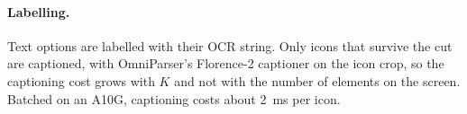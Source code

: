 \paragraph{Labelling.}
Text options are labelled with their OCR string. Only icons that survive the cut are captioned, with OmniParser's
Florence-2 captioner on the icon crop, so the captioning cost grows with $K$ and not with the number of elements
on the screen. Batched on an A10G, captioning costs about 2~ms per icon.
